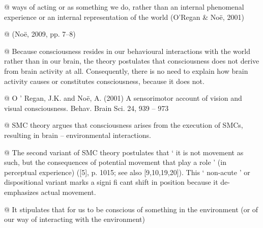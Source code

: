 \documentclass[utf8]{article}
\begin{document}
\begin{WritingMaterials}
			@ ways of acting or as something we do, rather than an internal phenomenal experience or an internal representation of the world (O’Regan \& Noë, 2001)

			@  (Noë, 2009, pp. 7–8)

			@ Because consciousness resides in our behavioural interactions with the world rather than in our brain, the theory postulates that consciousness does not derive from brain activity at all. Consequently, there is no need to explain how brain activity causes or constitutes consciousness, because it does not.

			@ O ’ Regan, J.K. and Noë, A. (2001) A sensorimotor account of vision and visual consciousness. Behav. Brain Sci. 24, 939 – 973

			@ SMC theory argues that consciousness arises from the execution of SMCs, resulting in brain – environmental interactions.

			@ The second variant of SMC theory postulates that ‘ it is not movement as such, but the consequences of potential movement that play a role ’ (in perceptual experience) ([5], p. 1015; see also [9,10,19,20]). This ‘ non-acute ’ or dispositional variant marks a signi fi cant shift in position because it de-emphasizes actual movement. \cite{pennartz2017consciousness}

			@ It stipulates that for us to be conscious of something in the environment (or of our way of interacting with the environment)

		\end{WritingMaterials}




\end{document}

